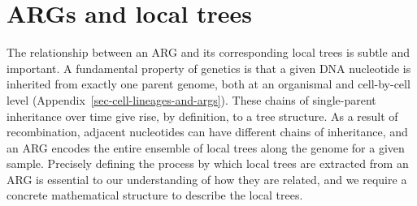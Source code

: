 \documentclass{article}
\begin{document}

\section{ARGs and local trees}
\label{sec-ARG-and-local-trees}
The relationship between an ARG and its corresponding
local trees is subtle and important.
A fundamental property of genetics is that a
given DNA nucleotide is inherited from exactly one parent genome,
both at an organismal and cell-by-cell level
(Appendix~\ref{sec-cell-lineages-and-args}).
These chains of single-parent inheritance over time give rise,
by definition, to a tree structure.
As a result of recombination, adjacent nucleotides can have
different chains of inheritance, and
an ARG encodes the entire ensemble of local trees along the
genome for a given sample.
Precisely defining the process by which local trees are extracted
from an ARG is essential to our understanding of how they
are related, and we require a concrete mathematical structure
to describe the local trees.
\end{document}
